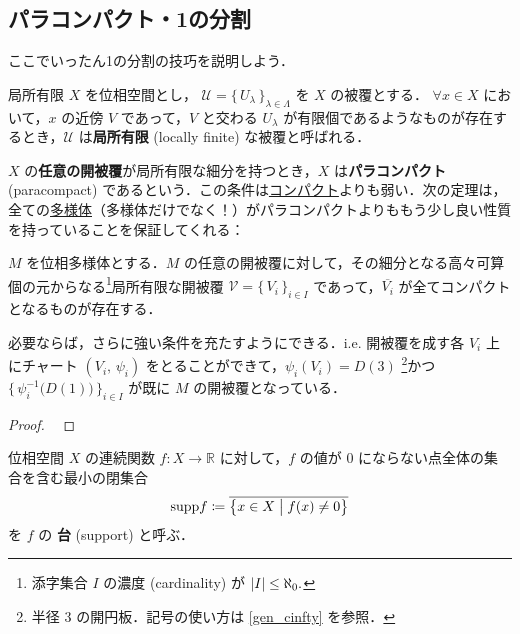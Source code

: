 \documentclass[geometry_main]{subfiles}
\begin{document}
\subsection{パラコンパクト・1の分割}

ここでいったん1の分割の技巧を説明しよう．

\begin{mydef}[label=def:locally-finite]{局所有限}
	$X$ を位相空間とし， $\mathcal{U} = \{\, U_\lambda \,\}_{\lambda \in \Lambda}$ を $X$ の被覆とする．
	$\forall x \in X$ において，$x$ の近傍 $V$ であって，$V$ と交わる $U_\lambda$ が有限個であるようなものが存在するとき，$\mathcal{U}$ は\textbf{局所有限} (locally finite) な被覆と呼ばれる．
\end{mydef}

$X$ の\textbf{任意の開被覆}が局所有限な細分を持つとき，$X$ は\textbf{パラコンパクト} (paracompact) であるという．この条件は\hyperref[def.compact]{コンパクト}よりも弱い．次の定理は，全ての\underline{多様体}（\cinfty 多様体だけでなく！）がパラコンパクトよりももう少し良い性質を持っていることを保証してくれる：

\begin{mytheo}[]{}
	$M$ を位相多様体とする．$M$ の任意の開被覆に対して，その細分となる高々可算個の元からなる\footnote{添字集合 $I$ の濃度 (cardinality) が $\abs{I} \le \aleph_0.$}局所有限な開被覆 $\mathcal{V} = \bigl\{\, V_i \,\bigr\}_{i \in I}$ であって，$\overline{V_i}$ が全てコンパクトとなるものが存在する．

	必要ならば，さらに強い条件を充たすようにできる．i.e. 開被覆を成す各 $V_i$ 上にチャート $(V_i,\, \psi_i)$ をとることができて，$\psi_i(V_i) = D(3)$ \footnote{半径 $3$ の開円板．記号の使い方は \ref{gen_cinfty} を参照．}かつ $\bigl\{\, \psi_i^{-1}\bigl(D(1)\bigr) \,\bigr\}_{i \in I}$ が既に $M$ の開被覆となっている．
\end{mytheo}

\begin{proof}
	~\cite[p.30, 命題1.29]{Morita}
\end{proof}


位相空間 $X$ の連続関数 $f \colon X \to \mathbb{R}$ に対して，$f$ の値が $0$ にならない点全体の集合を含む最小の閉集合
\begin{align} 
	\mathrm{supp} f \coloneqq \overline{\bigl\{ x \in X \bigm| f(x) \neq 0 \bigr\} }
\end{align}
を $f$ の \textbf{台} (support) と呼ぶ．
\end{document}
